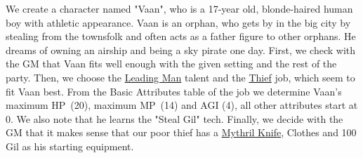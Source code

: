 \vspace{1cm}

{
We create a character named "Vaan", who is a 17-year old, blonde-haired human boy with athletic appearance. 
Vaan is an orphan, who gets by in the big city by stealing from the townsfolk and often acts as a father figure to other orphans.
He dreams of owning an airship and being a sky pirate one day. 
First, we check with the GM that Vaan fits well enough with the given setting and the rest of the party.
Then, we choose the \hyperlink{talent}{Leading Man} talent and the \hyperlink{Thief}{Thief} job, which seem to fit Vaan best.
From the Basic Attributes table of the job we determine Vaan's maximum HP~(20), maximum MP~(14) and AGI (4), all other attributes start at 0.
We also note that he learns the "Steal Gil" tech.
Finally, we decide with the GM that it makes sense that our poor thief has a \hyperlink{mknife}{Mythril Knife}, Clothes and 100 Gil as his starting equipment.
}

\pagebreak
